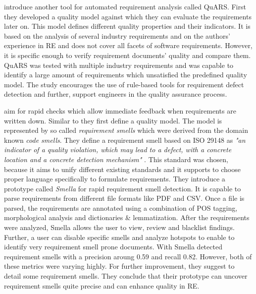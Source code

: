 \textcite{Fabbrini:2002} introduce another tool for automated requirement analysis called \ac{QuARS}.
First they developed a quality model against which they can evaluate the requirements later on.
This model defines different quality properties and their indicators.
It is based on the analysis of several industry requirements and on the authors' experience in \ac{RE} and does not cover all facets of software requirements.
However, it is specific enough to verify requirement documents' quality and compare them.
\Ac{QuARS} was tested with multiple industry requirements and was capable to identify a large amount of requirements which unsatisfied the predefined quality model.
The study encourages the use of rule-based tools for requirement defect detection and further, support engineers in the quality assurance process.

\textcite{Femmer:2017} aim for rapid checks which allow immediate feedback when requirements are written down.
Similar to \textcite{Fabbrini:2002} they first define a quality model.
The model is represented by so called \textit{requirement smells} which were derived from the domain known \textit{code smells}.
They define a requirement smell based on ISO 29148 as \textit{"an indicator of a quality violation, which may lead to a defect, with a concrete location and a concrete detection mechanism"} \parencite{Femmer:2017}.
This standard was chosen, because it aims to unify different existing standards and it supports to choose proper language specifically to formulate requirements.
They introduce a prototype called \textit{Smella} for rapid requirement smell detection.
It is capable to parse requirements from different file formats like \ac{PDF} and \ac{CSV}.
Once a file is parsed, the requirements are annotated using a combination of \ac{POS} tagging, morphological analysis and dictionaries \& lemmatization.
After the requirements were analyzed, Smella allows the user to view, review and blacklist findings.
Further, a user can disable specific smells and analyze hotspots to enable to identify very requirement smell prone documents.
With Smella \textcite{Femmer:2017} detected requirement smells with a precision aroung 0.59 and recall 0.82.
However, both of these metrics were varying highly.
For further improvement, they suggest to detail some requirement smells.
They conclude that their prototype can uncover requirement smells quite precise and can enhance quality in \ac{RE}.

